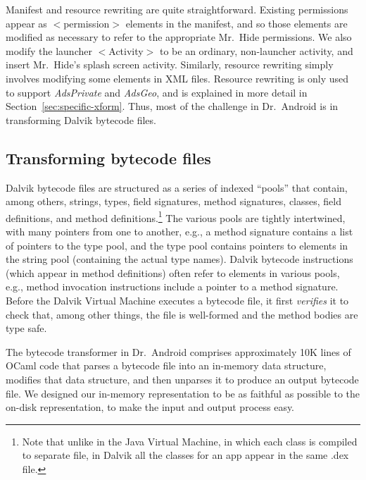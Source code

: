 \documentclass[preprint]{sig-alternate-10pt}
\newcommand{\code}[1]{\textsf{#1}}
\newcommand{\lib}{Mr.\ Hide\xspace}
\newcommand{\rewriter}{Dr.\ Android\xspace}
\newcommand{\perm}[1]{\textsf{\textit{#1}}}
\newcommand{\comment}[3][\color{red}]{}%
\newcommand{\jsjeon}[1]{\comment[\color{red}]{JJ}{#1}}
\newcommand{\polAdsBlindName}{\perm{AdsPrivate}\xspace}
\newcommand{\polAdsGeoName}{\perm{AdsGeo}\xspace}
\begin{document}
Manifest and resource rewriting are quite straightforward. Existing
permissions appear as \code{$<$permission$>$} elements in
the manifest, and so those elements are modified as
necessary to refer to the appropriate \lib permissions.
%
We also modify the launcher \code{$<$Activity$>$} to be an ordinary, non-launcher
activity, and insert \lib's splash screen activity.
%
Similarly, resource rewriting simply involves modifying some
elements in XML files. Resource rewriting is only used to support
\polAdsBlindName and \polAdsGeoName, and is explained in more detail in
Section~\ref{sec:specific-xform}. Thus, most of the challenge in
\rewriter is in transforming Dalvik bytecode files.

\subsection{Transforming bytecode files}

Dalvik bytecode files are structured as a series of indexed ``pools''
that contain, among others, strings, types, field signatures, method signatures,
classes, field definitions, and method definitions.\footnote{Note that
  unlike in the Java Virtual Machine, in which each class is compiled
  to separate file, in Dalvik all the classes for an app appear in the
  same \textsf{.dex} file.}  The various pools are tightly intertwined,
with many pointers from one to another, e.g., a method signature
contains a list of pointers to the type pool, and the type pool contains
pointers to elements in the string pool (containing the actual type names).
Dalvik bytecode instructions (which appear
in method definitions) often refer to elements in various pools, e.g.,
method invocation instructions include a pointer to a method
signature.
Before the Dalvik Virtual Machine executes a bytecode
file, it first \emph{verifies} it to check that, among other things, the file is
well-formed and the method bodies are type safe.

The bytecode transformer in \rewriter comprises approximately 10K
lines of OCaml code that parses a bytecode file into an in-memory data
structure, modifies that data structure, and then unparses it to
produce an output bytecode file. We designed our in-memory
representation to be as faithful as possible to the on-disk
representation, to make the input and output process easy.
\end{document}
